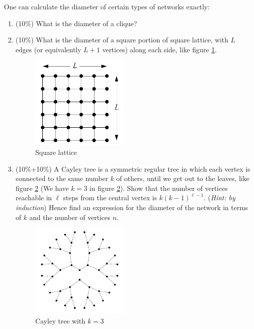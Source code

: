 \documentclass[12pt]{article}
\begin{document}
 One can calculate the diameter of certain types of networks exactly:
\begin{enumerate}[label=(\alph*)]
	\item (10\%) What is the diameter of a clique?
	\item (10\%) What is the diameter of a square portion of square lattice, with $L$ edges (or equivalently $L+1$ vertices) along each side, like figure \ref{square_lattice}.
	\begin{figure}[h]
		\centering
		\includegraphics[width=0.45\textwidth]{NS_HW_Fig_1.jpg}
		\caption{Square lattice}
		\label{square_lattice}
	\end{figure}
	\item (10\%+10\%) A Cayley tree is a symmetric regular tree in which each vertex is connected to the same number $k$ of others, until we get out to the leaves, like figure \ref{Cayley_tree} (We have $k = 3$ in figure \ref{Cayley_tree}). Show that the number of vertices reachable in $\ell$ steps from the central vertex is $k(k-1)^{\ell-1}$. ({\it Hint: by induction}) Hence find an expression for the diameter of the network in terms of $k$ and the number of vertices $n$.
	\begin{figure}[h]
		\centering
		\includegraphics[width=0.45\textwidth]{NS_HW_Fig_2.jpg}
		\caption{Cayley tree with $k = 3$}
		\label{Cayley_tree}
	\end{figure}
\end{enumerate}
\end{document}
